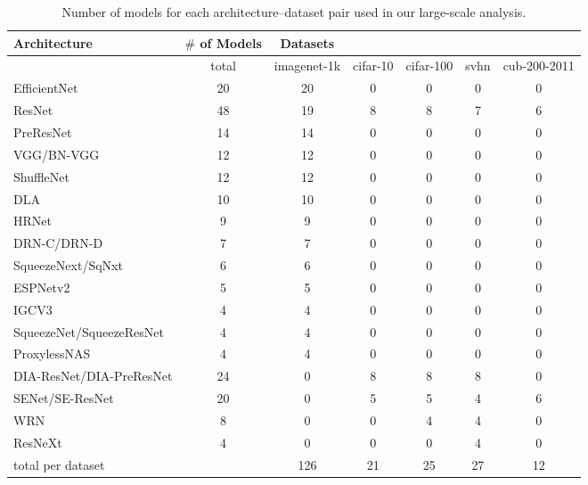 
\begin{table}[t]
\small
\begin{center}
\begin{tabular}{|l|c|c|c|c|c|c|}
\hline
Architecture & $\#$ of Models & Datasets & & & & \\
\hline

  & total &imagenet-1k & cifar-10 & cifar-100 & svhn & cub-200-2011 \\
\hline
EfficientNet & 20 &20 & 0 & 0 & 0 & 0 \\
ResNet & 48 &19 & 8 & 8 & 7 & 6 \\
PreResNet & 14 &14 & 0 & 0 & 0 & 0 \\
VGG/BN-VGG & 12 &12 & 0 & 0 & 0 & 0 \\
ShuffleNet & 12 &12 & 0 & 0 & 0 & 0 \\
DLA & 10 &10 & 0 & 0 & 0 & 0 \\
HRNet & 9 &9 & 0 & 0 & 0 & 0 \\
DRN-C/DRN-D & 7 &7 & 0 & 0 & 0 & 0 \\
SqueezeNext/SqNxt & 6 &6 & 0 & 0 & 0 & 0 \\
ESPNetv2 & 5 &5 & 0 & 0 & 0 & 0 \\
IGCV3 & 4 &4 & 0 & 0 & 0 & 0 \\
SqueezeNet/SqueezeResNet & 4 &4 & 0 & 0 & 0 & 0 \\
ProxylessNAS & 4 &4 & 0 & 0 & 0 & 0 \\
DIA-ResNet/DIA-PreResNet & 24 &0 & 8 & 8 & 8 & 0 \\
SENet/SE-ResNet & 20 &0 & 5 & 5 & 4 & 6 \\
WRN & 8 &0 & 0 & 4 & 4 & 0 \\
ResNeXt & 4 &0 & 0 & 0 & 4 & 0 \\
\hline
total per dataset & &  126 & 21 & 25 & 27 & 12 \\
\hline

\hline
\end{tabular}
\end{center}
\caption{Number of models for each architecture--dataset pair used in our large-scale analysis.}
\label{table:architectures}
\end{table}

